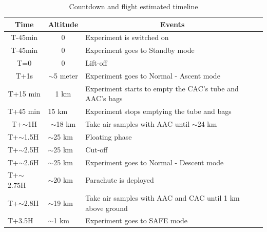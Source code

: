 \documentclass[a4paper,12pt,twoside]{article}
\providecommand{\DIFaddend}{} %
\DeclareRobustCommand{\DIFaddend}{\DIFOaddend \let\includegraphics\DIFOincludegraphics} %
\begin{document}
\DIFaddend \begin{table}[H]
\centering


\begin{tabular}{|l|l|l|}
\hline
\multicolumn{1}{|c|}{\textbf{Time}}       & \multicolumn{1}{c|}{\textbf{Altitude}}      & \multicolumn{1}{c|}{\textbf{Events}}                              \\ \hline
\multicolumn{1}{|c|}{T-45min}    & \multicolumn{1}{c|}{0}             & Experiment is switched on                                \\ \hline
\multicolumn{1}{|c|}{T-45min}    & \multicolumn{1}{c|}{0}             & Experiment goes to Standby mode                          \\ \hline
\multicolumn{1}{|c|}{T=0}        & \multicolumn{1}{c|}{0}             & Lift-off                                                 \\ \hline
\multicolumn{1}{|c|}{T+1s}       & \multicolumn{1}{c|}{$\sim$5 meter} & Experiment goes to Normal - Ascent mode                  \\ \hline
\multicolumn{1}{|c|}{T+15 min}   & \multicolumn{1}{c|}{1 km}          & Experiment starts to empty the CAC's tube and AAC's bags \\ \hline
T+45 min                         & 15 km                              & Experiment stops emptying the tube and bags              \\ \hline
\multicolumn{1}{|c|}{T+$\sim$1H} & \multicolumn{1}{c|}{$\sim$18 km}   & Take air samples with AAC until $\sim$24 km                       \\ \hline
T+$\sim$1.5H                     & $\sim$25 km                        & Floating phase                                           \\ \hline
T+$\sim$2.5H                     & $\sim$25 km                        & Cut-off                                                  \\ \hline
T+$\sim$2.6H                     & $\sim$25 km                        & Experiment goes to Normal - Descent mode                 \\ \hline
T+$\sim$2.75H                    & $\sim$20 km                        & Parachute is deployed                                    \\ \hline
T+$\sim$2.8H                     & $\sim$19 km                        & Take air samples with AAC and CAC until 1 km above ground                 \\ \hline
T+3.5H                           & $\sim$1 km                         & Experiment goes to SAFE mode                             \\ \hline
\end{tabular}
\caption{Countdown and flight estimated timeline}
\label{tab:countflight}
\end{table}
\raggedbottom
\pagebreak
\end{document}
